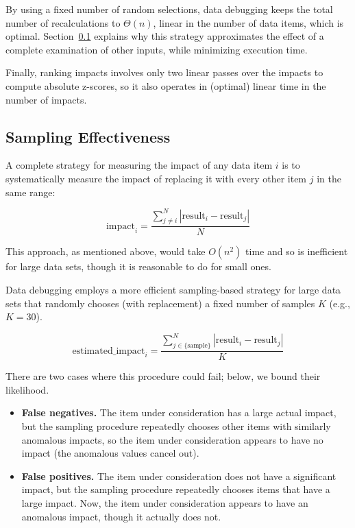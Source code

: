 By using a fixed number of random selections, data debugging keeps the
total number of recalculations to $\Theta(n)$, linear in the number of
data items, which is optimal. Section~\ref{sec:sampling_effectiveness}
explains why this strategy approximates the effect of a complete
examination of other inputs, while minimizing execution time.

Finally, ranking impacts involves only two linear passes over the
impacts to compute absolute z-scores, so it also operates in (optimal)
linear time in the number of impacts.

\subsection{Sampling Effectiveness}
\label{sec:sampling_effectiveness}

A complete strategy for measuring the impact of any data item $i$ is to
systematically measure the impact of replacing it with every other
item $j$ in the same range:

\begin{equation}
\mbox{impact}_i = \frac{\sum_{j \neq i}^{N}{|\mbox{result}_i-\mbox{result}_j|}}{N}
\end{equation}

\noindent
This approach, as mentioned above, would take $O(n^2)$ time and so is
inefficient for large data sets, though it is reasonable to do for
small ones.

Data debugging employs a more efficient sampling-based strategy for
large data sets that randomly chooses (with replacement) a fixed
number of samples $K$ (e.g., $K = 30$).

\begin{equation}
\mbox{estimated\_impact}_i = \frac{\sum_{j \in \{\mbox{sample}\}}^{N}{|\mbox{result}_i-\mbox{result}_j|}}{K}
\end{equation}

\noindent
There are two cases where this procedure could fail; below, we bound their likelihood.

\begin{itemize}
\item \textbf{False negatives.} The item under consideration has a
  large actual impact, but the sampling procedure repeatedly
  chooses other items with similarly anomalous impacts, so the item under
  consideration appears to have no impact (the anomalous values cancel out).
\item \textbf{False positives.} The item under consideration does
  not have a significant impact, but the sampling procedure
  repeatedly chooses items that have a large impact. Now, the item
  under consideration appears to have an anomalous impact, though it actually does not.
\end{itemize}

